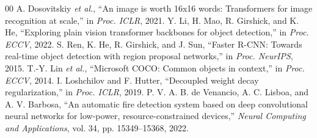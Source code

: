 \documentclass[conference]{IEEEtran}
\begin{document}
\begin{thebibliography}{00}
 A. Dosovitskiy \emph{et al.}, ``An image is worth 16x16 words: Transformers for image recognition at scale,'' in \emph{Proc. ICLR}, 2021.
 Y. Li, H. Mao, R. Girshick, and K. He, ``Exploring plain vision transformer backbones for object detection,'' in \emph{Proc. ECCV}, 2022.
 S. Ren, K. He, R. Girshick, and J. Sun, ``Faster R-CNN: Towards real-time object detection with region proposal networks,'' in \emph{Proc. NeurIPS}, 2015.
 T.-Y. Lin \emph{et al.}, ``Microsoft COCO: Common objects in context,'' in \emph{Proc. ECCV}, 2014.
 I. Loshchilov and F. Hutter, ``Decoupled weight decay regularization,'' in \emph{Proc. ICLR}, 2019.
 P. V. A. B. de Venancio, A. C. Lisboa, and A. V. Barbosa, ``An automatic fire detection system based on deep convolutional neural networks for low-power, resource-constrained devices,'' \emph{Neural Computing and Applications}, vol. 34, pp. 15349--15368, 2022.
\end{thebibliography}
\end{document}
